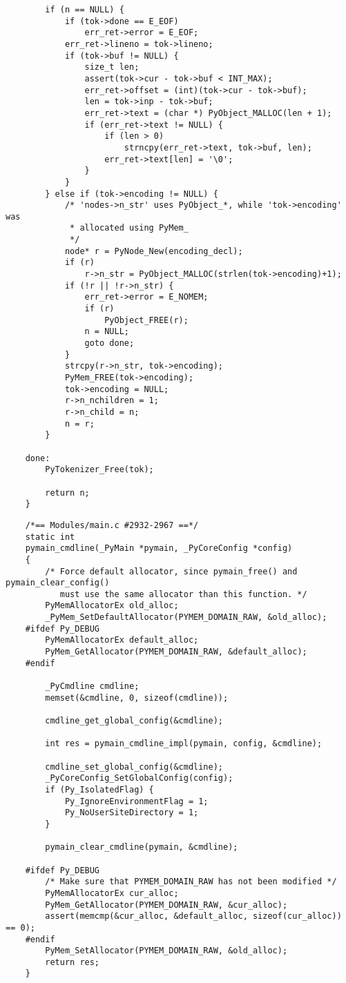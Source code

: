 \documentclass[UTF8]{book}
\begin{document}
\begin{lstlisting}
        if (n == NULL) {
            if (tok->done == E_EOF)
                err_ret->error = E_EOF;
            err_ret->lineno = tok->lineno;
            if (tok->buf != NULL) {
                size_t len;
                assert(tok->cur - tok->buf < INT_MAX);
                err_ret->offset = (int)(tok->cur - tok->buf);
                len = tok->inp - tok->buf;
                err_ret->text = (char *) PyObject_MALLOC(len + 1);
                if (err_ret->text != NULL) {
                    if (len > 0)
                        strncpy(err_ret->text, tok->buf, len);
                    err_ret->text[len] = '\0';
                }
            }
        } else if (tok->encoding != NULL) {
            /* 'nodes->n_str' uses PyObject_*, while 'tok->encoding' was
             * allocated using PyMem_
             */
            node* r = PyNode_New(encoding_decl);
            if (r)
                r->n_str = PyObject_MALLOC(strlen(tok->encoding)+1);
            if (!r || !r->n_str) {
                err_ret->error = E_NOMEM;
                if (r)
                    PyObject_FREE(r);
                n = NULL;
                goto done;
            }
            strcpy(r->n_str, tok->encoding);
            PyMem_FREE(tok->encoding);
            tok->encoding = NULL;
            r->n_nchildren = 1;
            r->n_child = n;
            n = r;
        }
    
    done:
        PyTokenizer_Free(tok);
    
        return n;
    }
\end{lstlisting}
\begin{lstlisting}
    /*== Modules/main.c #2932-2967 ==*/
    static int
    pymain_cmdline(_PyMain *pymain, _PyCoreConfig *config)
    {
        /* Force default allocator, since pymain_free() and pymain_clear_config()
           must use the same allocator than this function. */
        PyMemAllocatorEx old_alloc;
        _PyMem_SetDefaultAllocator(PYMEM_DOMAIN_RAW, &old_alloc);
    #ifdef Py_DEBUG
        PyMemAllocatorEx default_alloc;
        PyMem_GetAllocator(PYMEM_DOMAIN_RAW, &default_alloc);
    #endif

        _PyCmdline cmdline;
        memset(&cmdline, 0, sizeof(cmdline));

        cmdline_get_global_config(&cmdline);

        int res = pymain_cmdline_impl(pymain, config, &cmdline);

        cmdline_set_global_config(&cmdline);
        _PyCoreConfig_SetGlobalConfig(config);
        if (Py_IsolatedFlag) {
            Py_IgnoreEnvironmentFlag = 1;
            Py_NoUserSiteDirectory = 1;
        }

        pymain_clear_cmdline(pymain, &cmdline);

    #ifdef Py_DEBUG
        /* Make sure that PYMEM_DOMAIN_RAW has not been modified */
        PyMemAllocatorEx cur_alloc;
        PyMem_GetAllocator(PYMEM_DOMAIN_RAW, &cur_alloc);
        assert(memcmp(&cur_alloc, &default_alloc, sizeof(cur_alloc)) == 0);
    #endif
        PyMem_SetAllocator(PYMEM_DOMAIN_RAW, &old_alloc);
        return res;
    }
\end{lstlisting}
\end{document}
